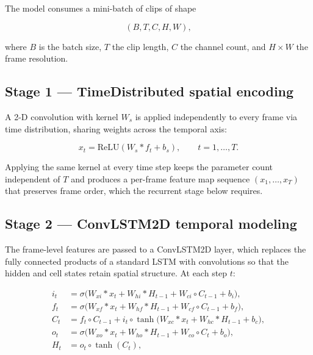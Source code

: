 \documentclass[11pt,a4paper]{article}
\begin{document}
    The model consumes a mini-batch of clips of shape

    \begin{equation}
        (B, T, C, H, W),
        \label{eq:batch}
    \end{equation}

    where $B$ is the batch size, $T$ the clip length, $C$ the channel count, and $H \times W$ the frame resolution.

    \subsection{Stage 1 --- TimeDistributed spatial encoding}

    A 2-D convolution with kernel $W_s$ is applied independently to every frame via time distribution, sharing weights across the temporal axis:

    \begin{equation}
        x_t = \mathrm{ReLU}(W_s * f_t + b_s), \qquad t = 1, \ldots, T.
        \label{eq:stage1}
    \end{equation}

    Applying the same kernel at every time step keeps the parameter count independent of $T$ and produces a per-frame feature map sequence $(x_1, \ldots, x_T)$ that preserves frame order, which the recurrent stage below requires.

    \subsection{Stage 2 --- ConvLSTM2D temporal modeling}

    The frame-level features are passed to a ConvLSTM2D layer, which replaces the fully connected products of a standard LSTM with convolutions so that the hidden and cell states retain spatial structure. At each step $t$:

    \begin{align}
        i_t &= \sigma\big(W_{xi} * x_t + W_{hi} * H_{t-1} + W_{ci} \circ C_{t-1} + b_i\big), \label{eq:input_gate} \\
        f_t &= \sigma\big(W_{xf} * x_t + W_{hf} * H_{t-1} + W_{cf} \circ C_{t-1} + b_f\big), \label{eq:forget_gate} \\
        C_t &= f_t \circ C_{t-1} + i_t \circ \tanh\big(W_{xc} * x_t + W_{hc} * H_{t-1} + b_c\big), \label{eq:cell_state} \\
        o_t &= \sigma\big(W_{xo} * x_t + W_{ho} * H_{t-1} + W_{co} \circ C_t + b_o\big), \label{eq:output_gate} \\
        H_t &= o_t \circ \tanh(C_t), \label{eq:hidden_state}
    \end{align}
\end{document}
